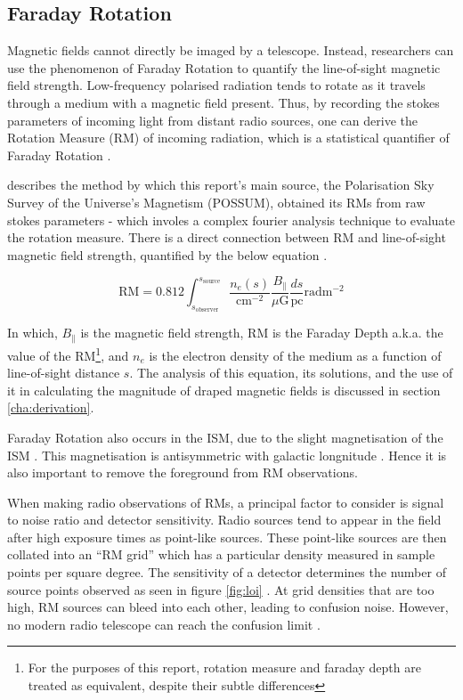 \subsection{Faraday Rotation}
\label{ssec:faraday}

Magnetic fields cannot directly be imaged by a telescope. Instead, researchers can use the phenomenon of Faraday Rotation to quantify the line-of-sight magnetic field strength. Low-frequency polarised radiation tends to rotate as it travels through a medium with a magnetic field present. Thus, by recording the stokes parameters of incoming light from distant radio sources, one can derive the Rotation Measure (RM) of incoming radiation, which is a statistical quantifier of Faraday Rotation \citep{ID1, ID14}. 


\cite{ID1} describes the method by which this report's main source, the Polarisation Sky Survey of the Universe's Magnetism (POSSUM), obtained its RMs from raw stokes parameters - which involes a complex fourier analysis technique to evaluate the rotation measure. There is a direct connection between RM and line-of-sight magnetic field strength, quantified by the below equation \citep{ID5, ID1, ID26, ID27, ID30}.


\begin{equation}
    \mathrm{RM} = 0.812 \int_{s_{\mathrm{observer}}}^{s_{\mathrm{source}}}{\frac{n_e(s)}{\mathrm{cm^{-2}}}\frac{B_{\parallel}}{\mu\mathrm{G}}\frac{ds}{\mathrm{pc}}} \mathrm{rad m^{-2}}
    \label{eq:rm_integral}
\end{equation}


In which, $B_{\parallel}$ is the magnetic field strength, $\mathrm{RM}$ is the Faraday Depth a.k.a. the value of the RM\footnote{For the purposes of this report, rotation measure and faraday depth are treated as equivalent, despite their subtle differences}, and $n_e$ is the electron density of the medium as a function of line-of-sight distance $s$. The analysis of this equation, its solutions, and the use of it in calculating the magnitude of draped magnetic fields is discussed in section \ref{cha:derivation}.


Faraday Rotation also occurs in the ISM, due to the slight magnetisation of the ISM \citep{ID37, ID30, ID21}. This magnetisation is antisymmetric with galactic longnitude \citep{ID30}. Hence it is also important to remove the foreground from RM observations.


When making radio observations of RMs, a principal factor to consider is signal to noise ratio and detector sensitivity. Radio sources tend to appear in the field after high exposure times as point-like sources. These point-like sources are then collated into an “RM grid” which has a particular density measured in sample points per square degree. The sensitivity of a detector determines the number of source points observed as seen in figure \ref{fig:loi} \citep{ID59}. At grid densities that are too high, RM sources can bleed into each other, leading to confusion noise. However, no modern radio telescope can reach the confusion limit \citep{ID59}.


